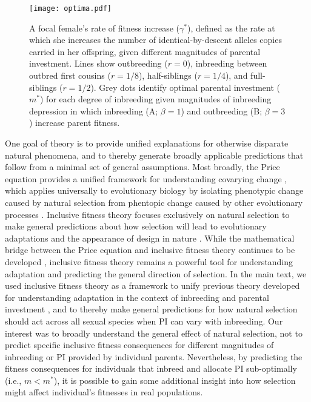 \documentclass[12pt]{article}
\begin{document}
\begin{figure}[H]
\begin{center}				
\texttt{[image: optima.pdf]}
\end{center}
\caption{A focal female's rate of fitness increase ($\gamma^{*}$), defined as the rate at which she increases the number of identical-by-descent alleles copies carried in her offspring, given different magnitudes of parental investment. Lines show outbreeding ($r=0$), inbreeding between outbred first cousins ($r=1/8$), half-siblings ($r=1/4$), and full-siblings ($r=1/2$). Grey dots identify optimal parental investment ($m^{*}$) for each degree of inbreeding given magnitudes of inbreeding depression in which inbreeding (A; $\beta=1$) and outbreeding (B; $\beta=3$) increase parent fitness.}
\label{optima}
\end{figure}

\clearpage

\noindent One goal of theory is to provide unified explanations for otherwise disparate natural phenomena, and to thereby generate broadly applicable predictions that follow from a minimal set of general assumptions. Most broadly, the Price equation provides a unified framework for understanding covarying change \cite[][]{Price1970}, which applies universally to evolutionary biology by isolating phenotypic change caused by natural selection from phentopic change caused by other evolutionary processes \cite[][]{Gardner2008}. Inclusive fitness theory focuses exclusively on natural selection to make general predictions about how selection will lead to evolutionary adaptations and the appearance of design in nature \cite[][]{Gardner2014}. While the mathematical bridge between the Price equation and inclusive fitness theory continues to be developed \cite[][]{Grafen2006, Grafen2014b}, inclusive fitness theory remains a powerful tool for understanding adaptation and predicting the general direction of selection. In the main text, we used inclusive fitness theory as a framework to unify previous theory developed for understanding adaptation in the context of inbreeding \cite[][]{Parker1979, Parker2006} and parental investment \cite[e.g.,][]{Macnair1978, Parker1978}, and to thereby make general predictions for how natural selection should act across all sexual species when PI can vary with inbreeding. Our interest was to broadly understand the general effect of natural selection, not to predict specific inclusive fitness consequences for different magnitudes of inbreeding or PI provided by individual parents. Nevertheless, by predicting the fitness consequences for individuals that inbreed and allocate PI sub-optimally (i.e., $m < m^{*}$), it is possible to gain some additional insight into how selection might affect individual's fitnesses in real populations. 
\end{document}
